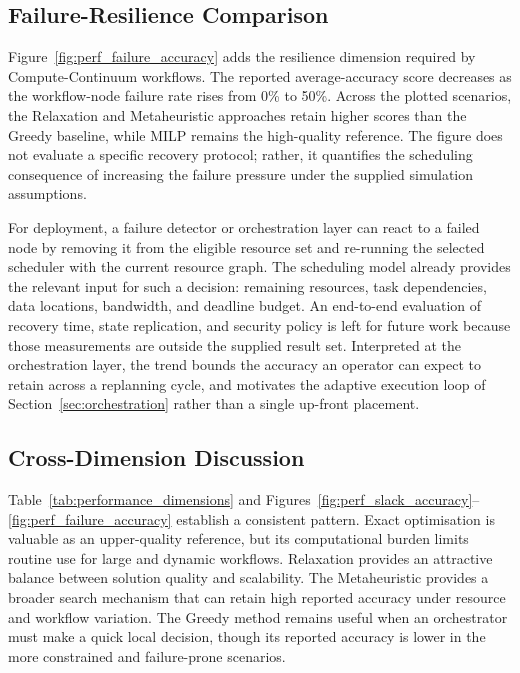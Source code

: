 \subsection{Failure-Resilience Comparison}

Figure~\ref{fig:perf_failure_accuracy} adds the resilience dimension required by Compute-Continuum workflows. The reported average-accuracy score decreases as the workflow-node failure rate rises from 0\% to 50\%. Across the plotted scenarios, the Relaxation and Metaheuristic approaches retain higher scores than the Greedy baseline, while MILP remains the high-quality reference. The figure does not evaluate a specific recovery protocol; rather, it quantifies the scheduling consequence of increasing the failure pressure under the supplied simulation assumptions.


For deployment, a failure detector or orchestration layer can react to a failed node by removing it from the eligible resource set and re-running the selected scheduler with the current resource graph. The scheduling model already provides the relevant input for such a decision: remaining resources, task dependencies, data locations, bandwidth, and deadline budget. An end-to-end evaluation of recovery time, state replication, and security policy is left for future work because those measurements are outside the supplied result set. Interpreted at the orchestration layer, the trend bounds the accuracy an operator can expect to retain across a replanning cycle, and motivates the adaptive execution loop of Section~\ref{sec:orchestration} rather than a single up-front placement.

\subsection{Cross-Dimension Discussion}

Table~\ref{tab:performance_dimensions} and Figures~\ref{fig:perf_slack_accuracy}--\ref{fig:perf_failure_accuracy} establish a consistent pattern. Exact optimisation is valuable as an upper-quality reference, but its computational burden limits routine use for large and dynamic workflows. Relaxation provides an attractive balance between solution quality and scalability. The Metaheuristic provides a broader search mechanism that can retain high reported accuracy under resource and workflow variation. The Greedy method remains useful when an orchestrator must make a quick local decision, though its reported accuracy is lower in the more constrained and failure-prone scenarios.

